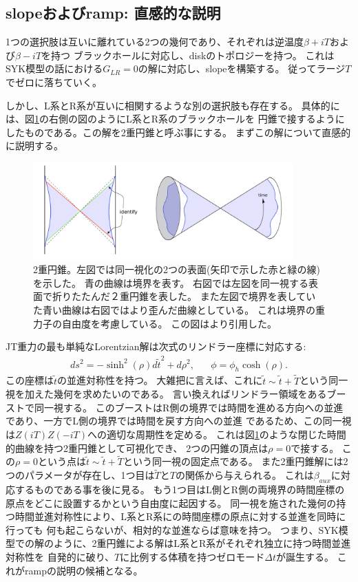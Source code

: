 \subsection{slopeおよびramp: 直感的な説明}
1つの選択肢は互いに離れている2つの幾何であり、それぞれは逆温度$\beta + iT$および$\beta - iT$を持つ
ブラックホールに対応し、diskのトポロジーを持つ。
これはSYK模型の話における$G_{LR} = 0$の解に対応し、slopeを構築する。
従ってラージ$T$でゼロに落ちていく。

しかし、L系とR系が互いに相関するような別の選択肢も存在する。
具体的には、図\ref{fig:double_cone}の右側の図のようにL系とR系のブラックホールを
円錐で接するようにしたものである。この解を2重円錐と呼ぶ事にする。
まずこの解について直感的に説明する。

\begin{figure}[ht]
	\centering
	\includegraphics[width=10cm]{figures/double_cone}
	\caption{
	2重円錐。左図では同一視化の2つの表面(矢印で示した赤と緑の線)を示した。
	青の曲線は境界を表す。
	右図では左図を同一視する表面で折りたたんだ２重円錐を表した。
	また左図で境界を表していた青い曲線は右図ではより歪んだ曲線としている。
	これは境界の重力子の自由度を考慮している。
	この図は\cite{polchinski_chaos}より引用した。}
	\label{fig:double_cone}
\end{figure}

JT重力の最も単純なLorentzian解は次式のリンドラー座標に対応する:
\begin{align}
	ds^2 = -\sinh^2(\rho)d\tilde{t}^2 + d\rho^2,\hspace{20pt}
	\phi = \phi_h\cosh(\rho).
\end{align}
この座標は$\tilde{t}$の並進対称性を持つ。
大雑把に言えば、これに$\tilde{t}\sim\tilde{t}+\tilde{T}$という同一視を加えた幾何を求めたいのである。
言い換えればリンドラー領域をあるブーストで同一視する。
このブーストはR側の境界では時間を進める方向への並進であり、一方でL側の境界では時間を戻す方向への並進
であるため、この同一視は$Z(iT)Z(-iT)$への適切な周期性を定める。
これは図\ref{fig:double_cone}のような閉じた時間的曲線を持つ2重円錐として可視化でき、
2つの円錐の頂点は$\rho = 0$で接する。
この$\rho = 0$という点は$\tilde{t}\sim\tilde{t}+\tilde{T}$という同一視の固定点である。
また2重円錐解には2つのパラメータが存在し、1つ目は$\tilde{T}$と$T$の関係から与えられる。
これは$\beta_{aux}$に対応するものである事を後に見る。
もう1つ目はL側とR側の両境界の時間座標の原点をどこに設置するかという自由度に起因する。
同一視を施された幾何の持つ時間並進対称性により、L系とR系にの時間座標の原点に対する並進を同時に行っても
何も起こらないが、相対的な並進ならば意味を持つ。
つまり、SYK模型での解のように、2重円錐による解はL系とR系がそれぞれ独立に持つ時間並進対称性を
自発的に破り、$T$に比例する体積を持つゼロモード$\Delta t$が誕生する。
これがrampの説明の候補となる。

